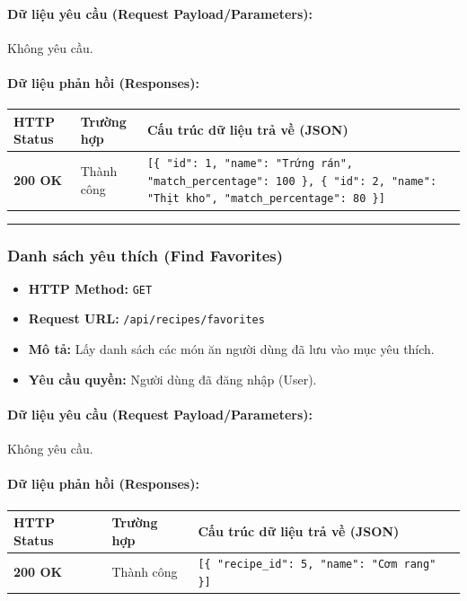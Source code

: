 \documentclass[12pt,a4paper]{article}
\begin{document}
\paragraph{Dữ liệu yêu cầu (Request Payload/Parameters):}
Không yêu cầu.\\

\paragraph{Dữ liệu phản hồi (Responses):}
\begin{longtable}{|>{\raggedright\arraybackslash}p{2.8cm}|>{\raggedright\arraybackslash}p{3.2cm}|>{\raggedright\arraybackslash}p{8.0cm}|}
\hline
\textbf{HTTP Status} & \textbf{Trường hợp} & \textbf{Cấu trúc dữ liệu trả về (JSON)} \\ \hline
\endhead
\textbf{200 OK} & Thành công & \texttt{[\{ "id": 1, "name": "Trứng rán", "match\_percentage": 100 \}, \{ "id": 2, "name": "Thịt kho", "match\_percentage": 80 \}]} \\ \hline
\end{longtable}

\vskip 0.4cm
\noindent\rule{\textwidth}{0.3pt}
\vskip 0.4cm

\subsubsection{Danh sách yêu thích (Find Favorites)}
\begin{itemize}[leftmargin=*]
    \item \textbf{HTTP Method:} \texttt{GET}
    \item \textbf{Request URL:} \texttt{/api/recipes/favorites}
    \item \textbf{Mô tả:} Lấy danh sách các món ăn người dùng đã lưu vào mục yêu thích.
    \item \textbf{Yêu cầu quyền:} Người dùng đã đăng nhập (User).
\end{itemize}

\paragraph{Dữ liệu yêu cầu (Request Payload/Parameters):}
Không yêu cầu.\\

\paragraph{Dữ liệu phản hồi (Responses):}
\begin{longtable}{|>{\raggedright\arraybackslash}p{2.8cm}|>{\raggedright\arraybackslash}p{3.2cm}|>{\raggedright\arraybackslash}p{8.0cm}|}
\hline
\textbf{HTTP Status} & \textbf{Trường hợp} & \textbf{Cấu trúc dữ liệu trả về (JSON)} \\ \hline
\endhead
\textbf{200 OK} & Thành công & \texttt{[\{ "recipe\_id": 5, "name": "Cơm rang" \}]} \\ \hline
\end{longtable}
\end{document}
